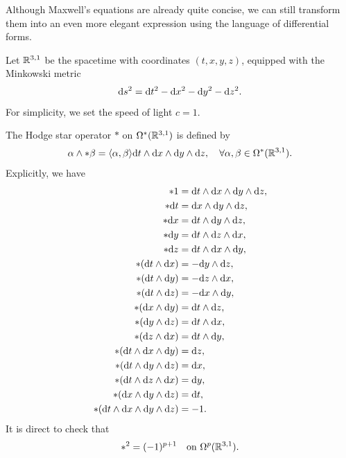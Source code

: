 Although Maxwell's equations are already quite concise, 
we can still transform them into an even more elegant expression using the language of differential forms. 

Let $\mathbb{R}^{3,1}$ be the spacetime with coordinates $(t, x, y, z)$, equipped with the Minkowski metric 
\begin{equation*}
    {\rm d} s^2 = {\rm d} t^2 - {\rm d} x^2 - {\rm d} y^2 - {\rm d} z^2.
\end{equation*}
For simplicity, we set the speed of light $c = 1$. 

The Hodge star operator $\ast$ on $\Omega^*(\mathbb{R}^{3,1})$ is defined by 
\begin{equation*}
    \alpha \wedge \ast \beta = \langle \alpha, \beta \rangle {\rm d} t \wedge {\rm d} x \wedge {\rm d} y \wedge {\rm d} z, 
    \quad \forall \alpha, \beta \in \Omega^*(\mathbb{R}^{3,1}).
\end{equation*}
Explicitly, we have
\begin{align*}
    \ast 1 &= {\rm d} t \wedge {\rm d} x \wedge {\rm d} y \wedge {\rm d} z, \\
    \ast {\rm d} t &= {\rm d} x \wedge {\rm d} y \wedge {\rm d} z, \\
    \ast {\rm d} x &= {\rm d} t \wedge {\rm d} y \wedge {\rm d} z, \\
    \ast {\rm d} y &= {\rm d} t \wedge {\rm d} z \wedge {\rm d} x, \\
    \ast {\rm d} z &= {\rm d} t \wedge {\rm d} x \wedge {\rm d} y, \\
    \ast ({\rm d} t \wedge {\rm d} x) &= -{\rm d} y \wedge {\rm d} z, \\
    \ast ({\rm d} t \wedge {\rm d} y) &= -{\rm d} z \wedge {\rm d} x, \\
    \ast ({\rm d} t \wedge {\rm d} z) &= -{\rm d} x \wedge {\rm d} y, \\
    \ast ({\rm d} x \wedge {\rm d} y) &= {\rm d} t \wedge {\rm d} z, \\
    \ast ({\rm d} y \wedge {\rm d} z) &= {\rm d} t \wedge {\rm d} x, \\
    \ast ({\rm d} z \wedge {\rm d} x) &= {\rm d} t \wedge {\rm d} y, \\
    \ast ({\rm d} t \wedge {\rm d} x \wedge {\rm d} y) &= {\rm d} z, \\
    \ast ({\rm d} t \wedge {\rm d} y \wedge {\rm d} z) &= {\rm d} x, \\
    \ast ({\rm d} t \wedge {\rm d} z \wedge {\rm d} x) &= {\rm d} y, \\
    \ast ({\rm d} x \wedge {\rm d} y \wedge {\rm d} z) &= {\rm d} t, \\
    \ast ({\rm d} t \wedge {\rm d} x \wedge {\rm d} y \wedge {\rm d} z) &= -1.
\end{align*}
It is direct to check that 
\begin{equation*}
    \ast^2 = (-1)^{p+1} \quad \text{on } \Omega^p(\mathbb{R}^{3,1}).
\end{equation*}
